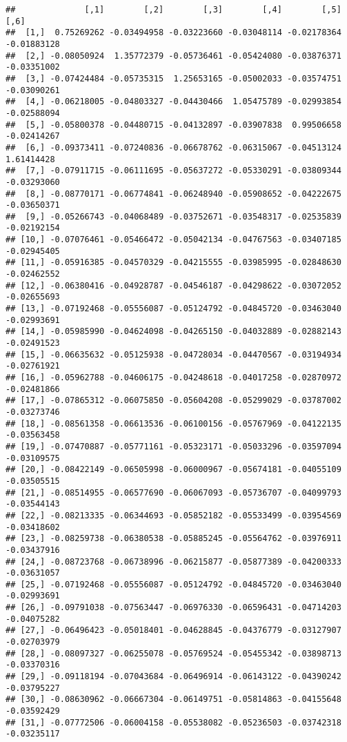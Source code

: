 \documentclass[
]{article}
\begin{document}
\begin{verbatim}
##              [,1]        [,2]        [,3]        [,4]        [,5]        [,6]
##  [1,]  0.75269262 -0.03494958 -0.03223660 -0.03048114 -0.02178364 -0.01883128
##  [2,] -0.08050924  1.35772379 -0.05736461 -0.05424080 -0.03876371 -0.03351002
##  [3,] -0.07424484 -0.05735315  1.25653165 -0.05002033 -0.03574751 -0.03090261
##  [4,] -0.06218005 -0.04803327 -0.04430466  1.05475789 -0.02993854 -0.02588094
##  [5,] -0.05800378 -0.04480715 -0.04132897 -0.03907838  0.99506658 -0.02414267
##  [6,] -0.09373411 -0.07240836 -0.06678762 -0.06315067 -0.04513124  1.61414428
##  [7,] -0.07911715 -0.06111695 -0.05637272 -0.05330291 -0.03809344 -0.03293060
##  [8,] -0.08770171 -0.06774841 -0.06248940 -0.05908652 -0.04222675 -0.03650371
##  [9,] -0.05266743 -0.04068489 -0.03752671 -0.03548317 -0.02535839 -0.02192154
## [10,] -0.07076461 -0.05466472 -0.05042134 -0.04767563 -0.03407185 -0.02945405
## [11,] -0.05916385 -0.04570329 -0.04215555 -0.03985995 -0.02848630 -0.02462552
## [12,] -0.06380416 -0.04928787 -0.04546187 -0.04298622 -0.03072052 -0.02655693
## [13,] -0.07192468 -0.05556087 -0.05124792 -0.04845720 -0.03463040 -0.02993691
## [14,] -0.05985990 -0.04624098 -0.04265150 -0.04032889 -0.02882143 -0.02491523
## [15,] -0.06635632 -0.05125938 -0.04728034 -0.04470567 -0.03194934 -0.02761921
## [16,] -0.05962788 -0.04606175 -0.04248618 -0.04017258 -0.02870972 -0.02481866
## [17,] -0.07865312 -0.06075850 -0.05604208 -0.05299029 -0.03787002 -0.03273746
## [18,] -0.08561358 -0.06613536 -0.06100156 -0.05767969 -0.04122135 -0.03563458
## [19,] -0.07470887 -0.05771161 -0.05323171 -0.05033296 -0.03597094 -0.03109575
## [20,] -0.08422149 -0.06505998 -0.06000967 -0.05674181 -0.04055109 -0.03505515
## [21,] -0.08514955 -0.06577690 -0.06067093 -0.05736707 -0.04099793 -0.03544143
## [22,] -0.08213335 -0.06344693 -0.05852182 -0.05533499 -0.03954569 -0.03418602
## [23,] -0.08259738 -0.06380538 -0.05885245 -0.05564762 -0.03976911 -0.03437916
## [24,] -0.08723768 -0.06738996 -0.06215877 -0.05877389 -0.04200333 -0.03631057
## [25,] -0.07192468 -0.05556087 -0.05124792 -0.04845720 -0.03463040 -0.02993691
## [26,] -0.09791038 -0.07563447 -0.06976330 -0.06596431 -0.04714203 -0.04075282
## [27,] -0.06496423 -0.05018401 -0.04628845 -0.04376779 -0.03127907 -0.02703979
## [28,] -0.08097327 -0.06255078 -0.05769524 -0.05455342 -0.03898713 -0.03370316
## [29,] -0.09118194 -0.07043684 -0.06496914 -0.06143122 -0.04390242 -0.03795227
## [30,] -0.08630962 -0.06667304 -0.06149751 -0.05814863 -0.04155648 -0.03592429
## [31,] -0.07772506 -0.06004158 -0.05538082 -0.05236503 -0.03742318 -0.03235117

\end{verbatim}
\end{document}
